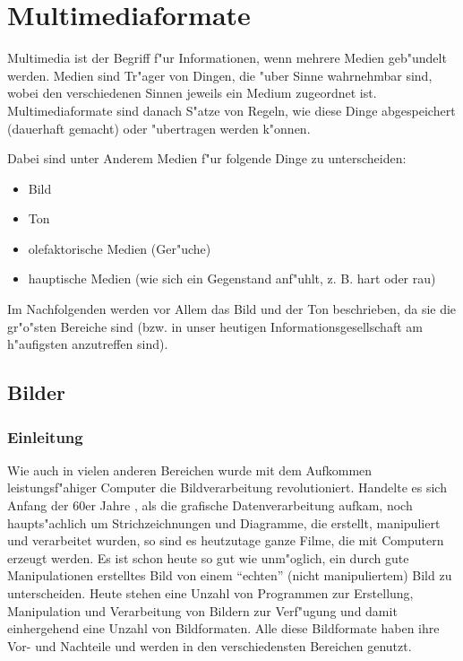 \section{Multimediaformate}

Multimedia ist der Begriff f"ur Informationen, wenn mehrere Medien geb"undelt werden. Medien sind Tr"ager von Dingen, die "uber Sinne wahrnehmbar sind, wobei den verschiedenen Sinnen jeweils ein Medium zugeordnet ist.
Multimediaformate sind danach S"atze von Regeln, wie diese Dinge abgespeichert (dauerhaft gemacht) oder "ubertragen werden k"onnen.

\bigskip\noindent
Dabei sind unter Anderem Medien f"ur folgende Dinge zu unterscheiden:
\begin{itemize}
\item Bild
\item Ton
\item olefaktorische Medien (Ger"uche)
\item hauptische Medien (wie sich ein Gegenstand anf"uhlt, z. B. hart oder rau)
\end{itemize}

Im Nachfolgenden werden vor Allem das Bild und der Ton beschrieben, da sie die gr"o"sten Bereiche sind (bzw. in unser heutigen Informationsgesellschaft am h"aufigsten anzutreffen sind).

\subsection{Bilder}

\subsubsection{Einleitung}

Wie auch in vielen anderen Bereichen wurde mit dem Aufkommen leistungsf"ahiger Computer die Bildverarbeitung revolutioniert. Handelte es sich Anfang der 60er Jahre \cite{projBildf}, als die grafische Datenverarbeitung aufkam, noch haupts"achlich um Strichzeichnungen und Diagramme, die erstellt, manipuliert und verarbeitet wurden, so sind es heutzutage ganze Filme, die mit Computern erzeugt werden. Es ist schon heute so gut wie unm"oglich, ein durch gute Manipulationen erstelltes Bild von einem ``echten'' (nicht manipuliertem) Bild zu unterscheiden.
Heute stehen eine Unzahl von Programmen zur Erstellung, Manipulation und Verarbeitung von Bildern zur Verf"ugung und damit einhergehend eine Unzahl von Bildformaten. Alle diese Bildformate haben ihre Vor- und Nachteile und werden in den verschiedensten Bereichen genutzt.

